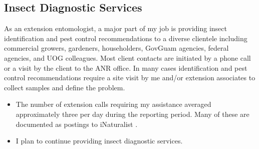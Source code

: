 \subsection{Insect Diagnostic Services}
\begin{refsection}
	
As an extension entomologist, a major part of my job is providing
insect identification and pest control recommendations to a diverse
clientele including commercial growers, gardeners, householders, GovGuam
agencies, federal agencies, and UOG colleagues. Most client contacts
are initiated by a phone call or a visit by the client to the ANR
office. In many cases identification and pest control recommendations
require a site visit by me and/or extension associates to collect
samples and define the problem.

\activities

\begin{itemize}
\item The number of extension calls requiring my assistance averaged approximately
three per day during the reporting period. Many of these are documented
as postings to iNaturalist \cite{moore_aubrey_2020}.
\end{itemize}

\plans

\begin{itemize}
\item I plan to continue providing insect diagnostic services.
\end{itemize}

\printbibliography

\end{refsection}


